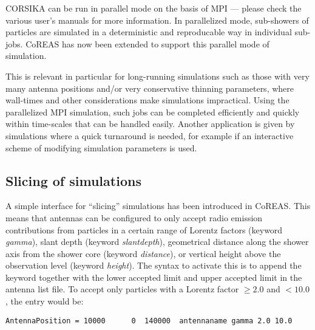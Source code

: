 \documentclass[a4paper,10pt]{article}
\begin{document}
CORSIKA can be run in parallel mode on the basis of MPI --- please check the various user's manuals for more information. In parallelized mode, sub-showers of particles are simulated in a deterministic and reproducable way in individual sub-jobs. CoREAS has now been extended to support this parallel mode of simulation.

This is relevant in particular for long-running simulations such as those with very many antenna positions and/or very conservative thinning parameters, where wall-times and other considerations make simulations impractical. Using the parallelized MPI simulation, such jobs can be completed efficiently and quickly within time-scales that can be handled easily. Another application is given by simulations where a quick turnaround is needed, for example if an interactive scheme of modifying simulation parameters is used.



\subsection{Slicing of simulations}

A simple interface for ``slicing'' simulations has been introduced in CoREAS. This means that antennas can be configured to only accept radio emission contributions from particles in a certain range of Lorentz factors (keyword \emph{gamma}), slant depth (keyword \emph{slantdepth}), geometrical distance along the shower axis from the shower core (keyword \emph{distance}), or vertical height above the observation level (keyword \emph{height}). The syntax to activate this is to append the keyword together with the lower accepted limit and upper accepted limit in the antenna list file. To accept only particles with a Lorentz factor $\geq 2.0$ and $< 10.0$, the entry would be:

\begin{verbatim}
AntennaPosition = 10000      0  140000  antennaname gamma 2.0 10.0
\end{verbatim}
\end{document}
